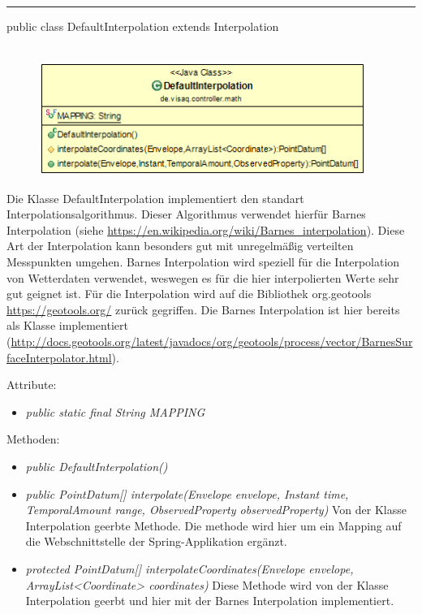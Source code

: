\rule{\textwidth}{0.4pt}
public class DefaultInterpolation extends Interpolation
\\\\
\begin{minipage}{0.4\textwidth}
    \begin{figure}[H]
        {\centering\includegraphics[width=0.95\textwidth]{media/backend/controller/classes/DefaultInterpolation.png}}
    \end{figure}
    \end{minipage} \hfill
\begin{minipage}{0.6\textwidth}
    Die Klasse DefaultInterpolation implementiert den standart Interpolationsalgorithmus.
    Dieser Algorithmus verwendet hierfür Barnes Interpolation (siehe \url{https://en.wikipedia.org/wiki/Barnes_interpolation}).
    Diese Art der Interpolation kann besonders gut mit unregelmäßig verteilten Messpunkten umgehen.
    Barnes Interpolation wird speziell für die Interpolation von Wetterdaten verwendet, weswegen es für die hier interpolierten Werte sehr gut geignet ist.
    Für die Interpolation wird auf die Bibliothek org.geotools \url{https://geotools.org/} zurück gegriffen.
    Die Barnes Interpolation ist hier bereits als Klasse implementiert (\url{http://docs.geotools.org/latest/javadocs/org/geotools/process/vector/BarnesSurfaceInterpolator.html}).
\end{minipage}

Attribute:
\begin{itemize}
    \item \emph{public static final String MAPPING} \mappingDescription
\end{itemize}
Methoden:
\begin{itemize}
    \item \emph{public DefaultInterpolation()}
    \item \emph{public PointDatum[] interpolate(Envelope envelope, Instant time, TemporalAmount range, ObservedProperty observedProperty)}
    Von der Klasse Interpolation geerbte Methode. Die methode wird hier um ein Mapping auf die Webschnittstelle der Spring-Applikation ergänzt.
   \item \emph{protected PointDatum[] interpolateCoordinates(Envelope envelope, ArrayList<Coordinate> coordinates)}
    Diese Methode wird von der Klasse Interpolation geerbt und hier mit der Barnes Interpolation implementiert.
\end{itemize}
